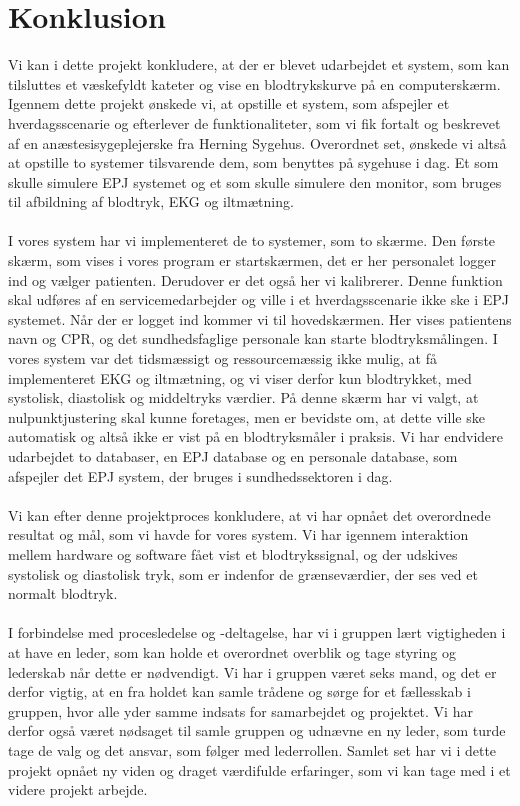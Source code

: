 \chapter{Konklusion}
Vi kan i dette projekt konkludere, at der er blevet udarbejdet et system, som kan tilsluttes et væskefyldt kateter og vise en blodtrykskurve på en computerskærm. Igennem dette projekt ønskede vi, at opstille et system, som afspejler et hverdagsscenarie og efterlever de funktionaliteter, som vi fik fortalt og beskrevet af en anæstesisygeplejerske fra Herning Sygehus. Overordnet set, ønskede vi altså at opstille to systemer tilsvarende dem, som benyttes på sygehuse i dag. Et som skulle simulere EPJ systemet og et som skulle simulere den monitor, som bruges til afbildning af blodtryk, EKG og iltmætning. \\
\\
I vores system har vi implementeret de to systemer, som to skærme. Den første skærm, som vises i vores program er startskærmen, det er her personalet logger ind og vælger patienten. Derudover er det også her vi kalibrerer. Denne funktion skal udføres af en servicemedarbejder og ville i et hverdagsscenarie ikke ske i EPJ systemet. Når der er logget ind kommer vi til hovedskærmen. Her vises patientens navn og CPR, og det sundhedsfaglige personale kan starte blodtryksmålingen. I vores system var det tidsmæssigt og ressourcemæssig ikke mulig, at få implementeret EKG og iltmætning, og vi viser derfor kun blodtrykket, med systolisk, diastolisk og middeltryks værdier. På denne skærm har vi valgt, at nulpunktjustering skal kunne foretages, men er bevidste om, at dette ville ske automatisk og altså ikke er vist på en blodtryksmåler i praksis.  Vi har endvidere udarbejdet to databaser, en EPJ database og en personale database, som afspejler det EPJ system, der bruges i sundhedssektoren i dag. \\
\\
Vi kan efter denne projektproces konkludere, at vi har opnået det overordnede resultat og mål, som vi havde for vores system. Vi har igennem interaktion mellem hardware og software fået vist et blodtrykssignal, og der udskives systolisk og diastolisk tryk, som er indenfor de grænseværdier, der ses ved et normalt blodtryk. \\
\\
I forbindelse med procesledelse og -deltagelse, har vi i gruppen lært vigtigheden i at have en leder, som kan holde et overordnet overblik og tage styring og lederskab når dette er nødvendigt. Vi har i gruppen været seks mand, og det er derfor vigtig, at en fra holdet kan samle trådene og sørge for et fællesskab i gruppen, hvor alle yder samme indsats for samarbejdet og projektet. Vi har derfor også været nødsaget til samle gruppen og udnævne en ny leder, som turde tage de valg og det ansvar, som følger med lederrollen. Samlet set har vi i dette projekt opnået ny viden og draget værdifulde erfaringer, som vi kan tage med i et videre projekt arbejde. 
